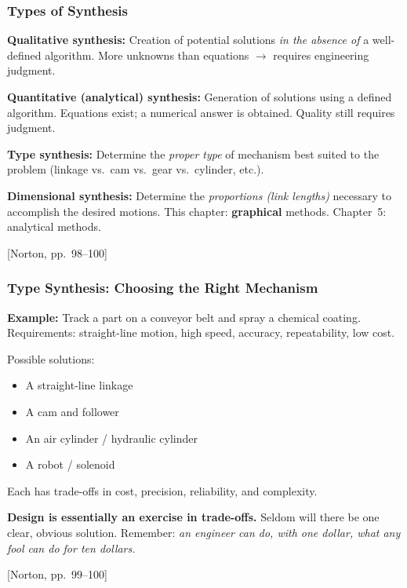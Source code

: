 \documentclass[10pt,aspectratio=43]{beamer}
\newcommand{\pref}[1]{\vfill\hfill{\scriptsize\color{gray}[Norton, pp.~#1]}}
\begin{document}
\begin{frame}
\frametitle{Types of Synthesis}

\begin{yellowbox}
\textbf{Qualitative synthesis:} Creation of potential solutions \emph{in the absence of} a well-defined algorithm. More unknowns than equations $\to$ requires engineering judgment.
\end{yellowbox}

\vspace{4pt}
\begin{yellowbox}
\textbf{Quantitative (analytical) synthesis:} Generation of solutions using a defined algorithm. Equations exist; a numerical answer is obtained. Quality still requires judgment.
\end{yellowbox}

\vspace{4pt}
\begin{yellowbox}
\textbf{Type synthesis:} Determine the \emph{proper type} of mechanism best suited to the problem (linkage vs.\ cam vs.\ gear vs.\ cylinder, etc.).
\end{yellowbox}

\vspace{4pt}
\begin{yellowbox}
\textbf{Dimensional synthesis:} Determine the \emph{proportions (link lengths)} necessary to accomplish the desired motions. This chapter: \textbf{graphical} methods. Chapter~5: analytical methods.
\end{yellowbox}
\pref{98--100}
\end{frame}

\begin{frame}
\frametitle{Type Synthesis: Choosing the Right Mechanism}

\textbf{Example:} Track a part on a conveyor belt and spray a chemical coating. Requirements: straight-line motion, high speed, accuracy, repeatability, low cost.

\vspace{4pt}
Possible solutions:
\begin{itemize}
  \item A straight-line linkage
  \item A cam and follower
  \item An air cylinder / hydraulic cylinder
  \item A robot / solenoid
\end{itemize}

\vspace{4pt}
Each has trade-offs in cost, precision, reliability, and complexity.

\begin{redbox}
\textbf{Design is essentially an exercise in trade-offs.} Seldom will there be one clear, obvious solution. Remember: \emph{an engineer can do, with one dollar, what any fool can do for ten dollars.}
\end{redbox}
\pref{99--100}
\end{frame}
\end{document}
